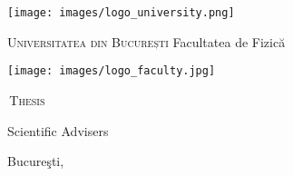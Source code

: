 \begin{titlepage}

	\centering

	\begin{minipage}[c]{0.15\textwidth}
		\centering
		\texttt{[image: images/logo\_university.png]}
	\end{minipage}
	\begin{minipage}[c]{0.6\textwidth}
		\centering
		{\Large\scshape Universitatea din București}
		{\large Facultatea de Fizică}
	\end{minipage}
	\begin{minipage}[c]{0.15\textwidth}
		\centering
		\texttt{[image: images/logo\_faculty.jpg]}
	\end{minipage}

	\smallvspace
	
		{\Large\sffamily \studentname}
		
	\smallvspace
	
	\topdoublerule 
	\begin{spacing}{2.5}
		{\huge\scshape\sffamily \thesistitle}
		\ifthenelse{\equal{\thesissubtitle}{}}{
		}{
		\\ 
		{\large \thesissubtitle}
		}		
	\end{spacing}
	\bottomdoublerule
	
	\smallvspace
	
		{\large\scshape \thesistype\,Thesis}	
		
	\mediumvspace

	\begin{minipage}{\textwidth}
		\begin{flushright} \large
			{Scientific Advisers} \\[5pt]
			\firstsupervisorprefix\hspace{5pt}{\sffamily \firstsupervisor}\ifthenelse{\equal{\secondsupervisor}{}}{\rowskip}{\\\secondsupervisorprefix\hspace{5pt}{\sffamily \secondsupervisor}}			
		\end{flushright}
	\end{minipage}

	\ifthenelse{\equal{\thesissubtitle}{}}{\bigvspace}{\itermediatevspace}

	{\large Bucureşti, \the\year}
	
	

\end{titlepage}
